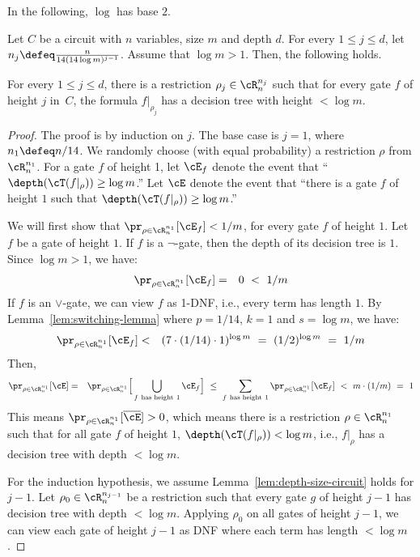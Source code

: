 \documentclass[11pt, a4paper]{article}
\begin{document}
In the following, $\log$ has base $2$.
\begin{lemma}
\label{lem:depth-size-circuit}
Let $C$ be a circuit with $n$ variables, size $m$ and depth $d$.
For every $1\leq j \leq d$, let $n_j  \defeq  \frac{n}{14(14 \log m)^{j-1}}$.
Assume that $\log m > 1$.
Then, the following holds.

For every $1\leq j \leq d$, there is a restriction $\rho_j \in \cR^{n_j}_n$ such that
for every gate $f$ of height $j$ in~$C$, 
the formula $f|_{\rho_j}$ has a decision tree with height $< \log m$.  
\end{lemma}
\begin{proof}
The proof is by induction on $j$.
The base case is $j=1$, where $n_1\defeq n/14$.
We randomly choose (with equal probability) a restriction $\rho$ from $\cR^{n_1}_n$.
For a gate $f$ of height 1,
let $\cE_f$ denote the event that ``$\depth(\cT(f|_{\rho}))\geq \log m$.''
Let $\cE$ denote the event that ``there is a gate $f$ of height $1$ such that $\depth(\cT(f|_{\rho}))\geq \log m$.''

We will first show that $\pr_{\rho\in \cR^{n_1}_n} [\cE_f] < 1/m$, for every gate $f$ of height $1$.
Let $f$ be a gate of height $1$.
If $f$ is a $\neg$-gate, then the depth of its decision tree is $1$.
Since $\log m > 1$, we have:
\begin{eqnarray*}
\pr_{\rho\in \cR^{n_1}_n} [ \cE_f] & = & 0 \ < \ 1/m
\end{eqnarray*}
If $f$ is an $\vee$-gate, we can view $f$ as 1-DNF, i.e., every term has length $1$.
By Lemma~\ref{lem:switching-lemma} where $p=1/14$, $k=1$ and $s=\log m$,
we have:
\begin{eqnarray*}
\pr_{\rho\in \cR^{n_1}_n} [\cE_f] & < &  (7 \cdot (1/14) \cdot 1)^{\log m}
\ = \ (1/2)^{\log m} \ = \ 1/m 
\end{eqnarray*}
Then, 
\begin{eqnarray*}
\pr_{\rho\in \cR^{n_1}_n} [\cE] & = & \pr_{\rho\in \cR^{n_1}_n} \Big[\bigcup_{f\ \text{has height}\ 1} \cE_f\Big]
\ \leq \ \sum_{f\ \text{has height}\ 1} \pr_{\rho\in \cR^{n_1}_n} [ \cE_f]
\ < \ m\cdot (1/m) \ = \ 1
\end{eqnarray*}
This means $\pr_{\rho\in \cR^{n_1}_n} [\overline{\cE}]> 0$,
which means there is a restriction $\rho \in \cR^{n_1}_n$ such that for all gate $f$ of height $1$,
$\depth(\cT(f|_{\rho}))<\log m$, i.e.,
$f|_{\rho}$ has a decision tree with depth $< \log m$.


For the induction hypothesis,
we assume Lemma~\ref{lem:depth-size-circuit} holds for $j-1$.
Let  $\rho_0 \in \cR^{n_{j-1}}_n$ be a restriction such that
every gate $g$ of height $j-1$ has decision tree with depth $< \log m$.
Applying $\rho_0$ on all gates of height $j-1$,
we can view each gate of height $j-1$ as DNF where each term has length $< \log m$.


\end{proof}
\end{document}
